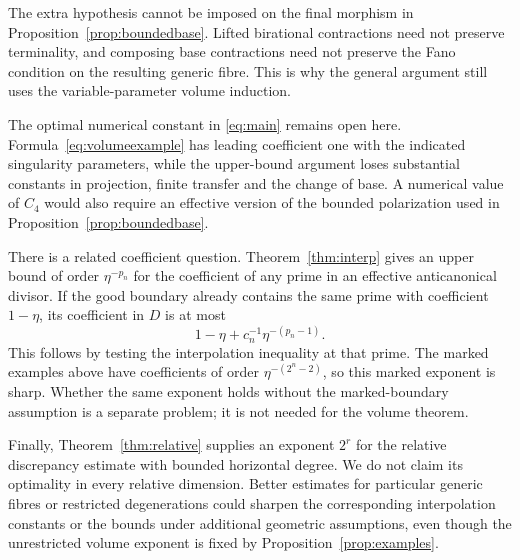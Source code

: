 \documentclass[11pt,reqno]{amsart}
\numberwithin{equation}{section}
\theoremstyle{definition}
\theoremstyle{remark}
\begin{document}
The extra hypothesis cannot be imposed on the final morphism in Proposition~\ref{prop:boundedbase}. Lifted birational contractions need not preserve terminality, and composing base contractions need not preserve the Fano condition on the resulting generic fibre. This is why the general argument still uses the variable-parameter volume induction.

The optimal numerical constant in \eqref{eq:main} remains open here. Formula~\eqref{eq:volumeexample} has leading coefficient one with the indicated singularity parameters, while the upper-bound argument loses substantial constants in projection, finite transfer and the change of base. A numerical value of $C_4$ would also require an effective version of the bounded polarization used in Proposition~\ref{prop:boundedbase}.

There is a related coefficient question. Theorem~\ref{thm:interp} gives an upper bound of order $\eta^{-p_n}$ for the coefficient of any prime in an effective anticanonical divisor. If the good boundary already contains the same prime with coefficient $1-\eta$, its coefficient in $D$ is at most
\[
 1-\eta+c_n^{-1}\eta^{-(p_n-1)}.
\]
This follows by testing the interpolation inequality at that prime. The marked examples above have coefficients of order $\eta^{-(2^n-2)}$, so this marked exponent is sharp. Whether the same exponent holds without the marked-boundary assumption is a separate problem; it is not needed for the volume theorem.

Finally, Theorem~\ref{thm:relative} supplies an exponent $2^r$ for the relative discrepancy estimate with bounded horizontal degree. We do not claim its optimality in every relative dimension. Better estimates for particular generic fibres or restricted degenerations could sharpen the corresponding interpolation constants or the bounds under additional geometric assumptions, even though the unrestricted volume exponent is fixed by Proposition~\ref{prop:examples}.
\end{document}
